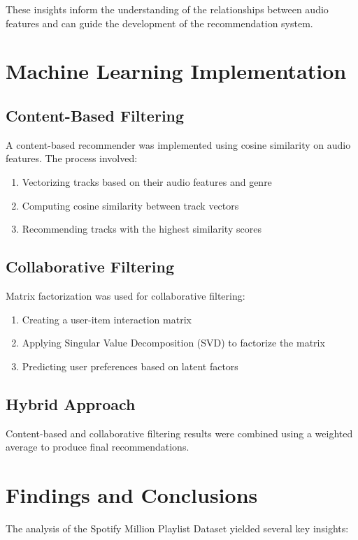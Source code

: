 \documentclass[runningheads]{llncs}
\begin{document}
These insights inform the understanding of the relationships between audio features and can guide the development of the recommendation system.

\section{Machine Learning Implementation}

\subsection{Content-Based Filtering}
A content-based recommender was implemented using cosine similarity on audio features. The process involved:
\begin{enumerate}
    \item Vectorizing tracks based on their audio features and genre
    \item Computing cosine similarity between track vectors
    \item Recommending tracks with the highest similarity scores
\end{enumerate}

\subsection{Collaborative Filtering}
Matrix factorization was used for collaborative filtering:
\begin{enumerate}
    \item Creating a user-item interaction matrix
    \item Applying Singular Value Decomposition (SVD) to factorize the matrix
    \item Predicting user preferences based on latent factors
\end{enumerate}

\subsection{Hybrid Approach}
Content-based and collaborative filtering results were combined using a weighted average to produce final recommendations.

\section{Findings and Conclusions}

The analysis of the Spotify Million Playlist Dataset yielded several key insights:
\end{document}
